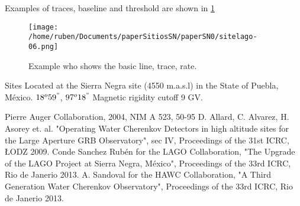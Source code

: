 \documentclass[a4paper]{article}
\begin{document}
Examples of traces, baseline and threshold are shown in \textcolor{red}{\ref{sitelago06}}

\begin{figure}[t]
\centering
\texttt{[image: /home/ruben/Documents/paperSitiosSN/paperSN0/sitelago-06.png]}
\caption{Example who shows the basic line, trace, rate.}
\label{sitelago06}
\end{figure} 

Sites Located at the Sierra Negra site (4550 m.a.s.l) in the State of Puebla, México.
$18^o 59^{"}$, $97^o  18^{"}$ Magnetic rigidity cutoff 9 GV.


\begin{thebibliography}{}
 Pierre Auger Collaboration, 2004, NIM A 523, 50-95
D. Allard, C. Alvarez, H. Asorey et. al. "Operating Water Cherenkov Detectors in high altitude sites for the
Large Aperture GRB Observatory", sec IV, Proceedings of the 31st ICRC, ŁODZ 2009.
Conde Sanchez Rubén for the LAGO Collaboration,  "The Upgrade of the LAGO Project at Sierra Negra, México", Proceedings of the 33rd ICRC, Rio de Janerio 2013.
A. Sandoval for the  HAWC Collaboration, "A Third Generation Water Cherenkov Observatory", Proceedings of the 33rd ICRC, Rio de Janerio 2013.
\end{thebibliography}
\end{document}
